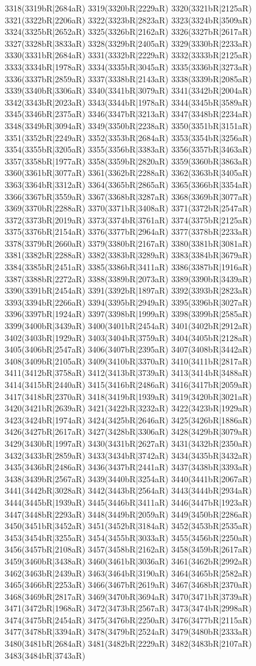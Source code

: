 3318(3319bR|2684aR) 3319(3320bR|2229aR) 3320(3321bR|2125aR) 3321(3322bR|2206aR) 3322(3323bR|2823aR) 3323(3324bR|3509aR) 3324(3325bR|2652aR) 3325(3326bR|2162aR) 3326(3327bR|2617aR) 3327(3328bR|3833aR) 3328(3329bR|2405aR) 3329(3330bR|2233aR) 3330(3331bR|2684aR) 3331(3332bR|2229aR) 3332(3333bR|2125aR) 3333(3334bR|1978aR) 3334(3335bR|3045aR) 3335(3336bR|3273aR) 3336(3337bR|2859aR) 3337(3338bR|2143aR) 3338(3339bR|2085aR) 3339(3340bR|3306aR) 3340(3341bR|3079aR) 3341(3342bR|2004aR) 3342(3343bR|2023aR) 3343(3344bR|1978aR) 3344(3345bR|3589aR) 3345(3346bR|2375aR) 3346(3347bR|3213aR) 3347(3348bR|2234aR) 3348(3349bR|3094aR) 3349(3350bR|2238aR) 3350(3351bR|3151aR) 3351(3352bR|2249aR) 3352(3353bR|2684aR) 3353(3354bR|3256aR) 3354(3355bR|3205aR) 3355(3356bR|3383aR) 3356(3357bR|3463aR) 3357(3358bR|1977aR) 3358(3359bR|2820aR) 3359(3360bR|3863aR) 3360(3361bR|3077aR) 3361(3362bR|2288aR) 3362(3363bR|3405aR) 3363(3364bR|3312aR) 3364(3365bR|2865aR) 3365(3366bR|3354aR) 3366(3367bR|3559aR) 3367(3368bR|3287aR) 3368(3369bR|3077aR) 3369(3370bR|2288aR) 3370(3371bR|3408aR) 3371(3372bR|2547aR) 3372(3373bR|2019aR) 3373(3374bR|3761aR) 3374(3375bR|2125aR) 3375(3376bR|2154aR) 3376(3377bR|2964aR) 3377(3378bR|2233aR) 3378(3379bR|2660aR) 3379(3380bR|2167aR) 3380(3381bR|3081aR) 3381(3382bR|2288aR) 3382(3383bR|3289aR) 3383(3384bR|3679aR) 3384(3385bR|2451aR) 3385(3386bR|3411aR) 3386(3387bR|1916aR) 3387(3388bR|2272aR) 3388(3389bR|2073aR) 3389(3390bR|3439aR) 3390(3391bR|2454aR) 3391(3392bR|1897aR) 3392(3393bR|2823aR) 3393(3394bR|2266aR) 3394(3395bR|2949aR) 3395(3396bR|3027aR) 3396(3397bR|1924aR) 3397(3398bR|1999aR) 3398(3399bR|2585aR) 3399(3400bR|3439aR) 3400(3401bR|2454aR) 3401(3402bR|2912aR) 3402(3403bR|1929aR) 3403(3404bR|3759aR) 3404(3405bR|2128aR) 3405(3406bR|2547aR) 3406(3407bR|2395aR) 3407(3408bR|3442aR) 3408(3409bR|2105aR) 3409(3410bR|3370aR) 3410(3411bR|2817aR) 3411(3412bR|3758aR) 3412(3413bR|3739aR) 3413(3414bR|3488aR) 3414(3415bR|2440aR) 3415(3416bR|2486aR) 3416(3417bR|2059aR) 3417(3418bR|2370aR) 3418(3419bR|1939aR) 3419(3420bR|3021aR) 3420(3421bR|2639aR) 3421(3422bR|3232aR) 3422(3423bR|1929aR) 3423(3424bR|1974aR) 3424(3425bR|2646aR) 3425(3426bR|1886aR) 3426(3427bR|2617aR) 3427(3428bR|3306aR) 3428(3429bR|3079aR) 3429(3430bR|1997aR) 3430(3431bR|2627aR) 3431(3432bR|2350aR) 3432(3433bR|2859aR) 3433(3434bR|3742aR) 3434(3435bR|3432aR) 3435(3436bR|2486aR) 3436(3437bR|2441aR) 3437(3438bR|3393aR) 3438(3439bR|2567aR) 3439(3440bR|3254aR) 3440(3441bR|2067aR) 3441(3442bR|3028aR) 3442(3443bR|2564aR) 3443(3444bR|2934aR) 3444(3445bR|1939aR) 3445(3446bR|3411aR) 3446(3447bR|1923aR) 3447(3448bR|2293aR) 3448(3449bR|2059aR) 3449(3450bR|2286aR) 3450(3451bR|3452aR) 3451(3452bR|3184aR) 3452(3453bR|2535aR) 3453(3454bR|3255aR) 3454(3455bR|3033aR) 3455(3456bR|2250aR) 3456(3457bR|2108aR) 3457(3458bR|2162aR) 3458(3459bR|2617aR) 3459(3460bR|3438aR) 3460(3461bR|3036aR) 3461(3462bR|2992aR) 3462(3463bR|2439aR) 3463(3464bR|3190aR) 3464(3465bR|2582aR) 3465(3466bR|2253aR) 3466(3467bR|2619aR) 3467(3468bR|2370aR) 3468(3469bR|2817aR) 3469(3470bR|3694aR) 3470(3471bR|3739aR) 3471(3472bR|1968aR) 3472(3473bR|2567aR) 3473(3474bR|2998aR) 3474(3475bR|2454aR) 3475(3476bR|2250aR) 3476(3477bR|2115aR) 3477(3478bR|3394aR) 3478(3479bR|2524aR) 3479(3480bR|2333aR) 3480(3481bR|2684aR) 3481(3482bR|2229aR) 3482(3483bR|2107aR) 3483(3484bR|3743aR) 